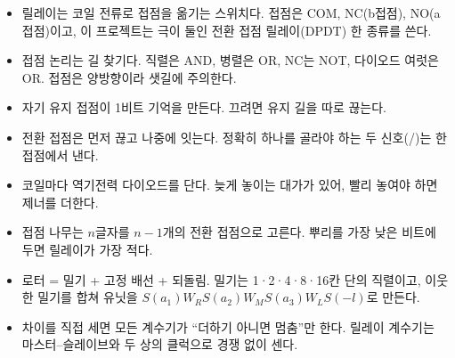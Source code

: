 \begin{itemize}
\item 릴레이는 코일 전류로 접점을 옮기는 스위치다. 접점은 COM, NC(b접점), NO(a접점)이고, 이 프로젝트는 극이
둘인 전환 접점 릴레이(DPDT) 한 종류를 쓴다.
\item 접점 논리는 길 찾기다. 직렬은 AND, 병렬은 OR, NC는 NOT, 다이오드 여럿은 OR. 접점은 양방향이라 샛길에
주의한다.
\item 자기 유지 접점이 1비트 기억을 만든다. 끄려면 유지 길을 따로 끊는다.
\item 전환 접점은 먼저 끊고 나중에 잇는다. 정확히 하나를 골라야 하는 두 신호(/)는 한 접점에서
낸다.
\item 코일마다 역기전력 다이오드를 단다. 늦게 놓이는 대가가 있어, 빨리 놓여야 하면 제너를 더한다.
\item 접점 나무는 $n$글자를 $n-1$개의 전환 접점으로 고른다. 뿌리를 가장 낮은 비트에 두면 릴레이가 가장 적다.
\item 로터 = 밀기 + 고정 배선 + 되돌림. 밀기는 1·2·4·8·16칸 단의 직렬이고, 이웃한 밀기를 합쳐 유닛을
$S(a_1)W_RS(a_2)W_MS(a_3)W_LS(-l)$로 만든다.
\item 차이를 직접 세면 모든 계수기가 ``더하기 아니면 멈춤''만 한다. 릴레이 계수기는 마스터--슬레이브와 두 상의
클럭으로 경쟁 없이 센다.
\end{itemize}
